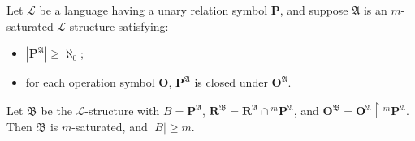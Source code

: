Let $\mathcal{L}$ be a language having a unary relation symbol $\mathbf{P}$, and suppose $\mathfrak{A}$ is an $m$-saturated $\mathcal{L}$-structure satisfying:
\begin{itemize}
\item[(i)] $|\mathbf{P}^{\mathfrak{A}}| \geq \aleph_0$;
\item[(ii)] for each operation symbol $\mathbf{O}$, $\mathbf{P}^{\mathfrak{A}}$ is closed under $\mathbf{O}^{\mathfrak{A}}$.
\end{itemize}
Let $\mathfrak{B}$ be the $\mathcal{L}$-structure with $B = \mathbf{P}^{\mathfrak{A}}$, $\mathbf{R}^{\mathfrak{B}} = \mathbf{R}^{\mathfrak{A}} \cap {}^m \mathbf{P}^{\mathfrak{A}}$, and $\mathbf{O}^{\mathfrak{B}} = \mathbf{O}^{\mathfrak{A}} \upharpoonright {}^m \mathbf{P}^{\mathfrak{A}}$. Then $\mathfrak{B}$ is $m$-saturated, and $|B| \geq m$.
